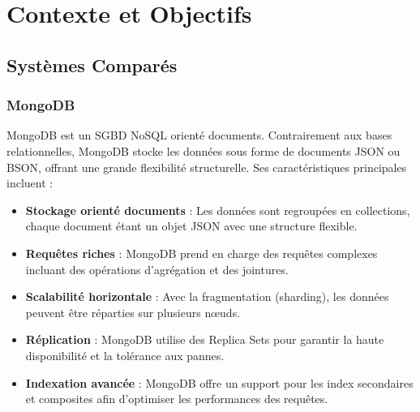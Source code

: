 \documentclass[12pt,a4paper]{report}
\begin{document}
\chapter{Contexte et Objectifs}

\section{Systèmes Comparés}


    \subsection{MongoDB}
    \begin{card}
        MongoDB est un SGBD NoSQL orienté documents. 
        Contrairement aux bases relationnelles, MongoDB stocke les données sous forme de documents JSON ou BSON, offrant une grande flexibilité structurelle. Ses caractéristiques principales incluent :

        \begin{itemize}
            \item \textbf{Stockage orienté documents} : Les données sont regroupées en collections, chaque document étant un objet JSON avec une structure flexible.
            \item \textbf{Requêtes riches} : MongoDB prend en charge des requêtes complexes incluant des opérations d'agrégation et des jointures.
            \item \textbf{Scalabilité horizontale} : Avec la fragmentation (sharding), les données peuvent être réparties sur plusieurs nœuds.
            \item \textbf{Réplication} : MongoDB utilise des Replica Sets pour garantir la haute disponibilité et la tolérance aux pannes.
            \item \textbf{Indexation avancée} : MongoDB offre un support pour les index secondaires et composites afin d'optimiser les performances des requêtes.
        \end{itemize}
    \end{card}
\end{document}
